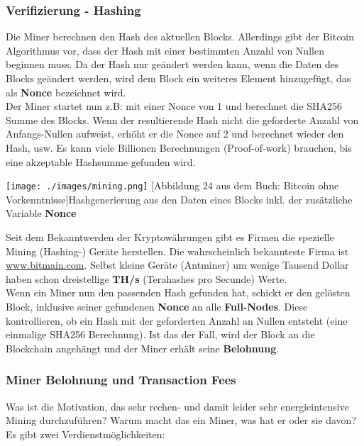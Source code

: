 \documentclass[10pt,a4paper,titlepage]{article}
\begin{document}
\subsubsection{Verifizierung - Hashing}
Die Miner berechnen den Hash des aktuellen Blocks. Allerdings gibt der Bitcoin Algorithmus vor, dass der Hash mit einer bestimmten Anzahl von Nullen beginnen muss. Da der Hash nur geändert werden kann, wenn die Daten des Blocks geändert werden, wird dem Block ein weiteres Element hinzugefügt, das als \textbf{Nonce} bezeichnet wird.\\
Der Miner startet nun z.B: mit einer Nonce von 1 und berechnet die SHA256 Summe des Blocks. Wenn der resultierende Hash nicht die geforderte Anzahl von Anfangs-Nullen aufweist, erhöht er die Nonce auf 2 und berechnet wieder den Hash, usw. Es kann viele Billionen Berechnungen (Proof-of-work) brauchen, bis eine akzeptable Hashsumme gefunden wird.
\begin{center}
\texttt{[image: ./images/mining.png]}
[Abbildung 24 aus dem Buch: Bitcoin ohne Vorkenntnisse]{Hashgenerierung aus den Daten eines Blocks inkl. der zusätzliche Variable \textbf{Nonce}}
\end{center}
Seit dem Bekanntwerden der Kryptowährungen gibt es Firmen die spezielle Mining (Hashing-) Geräte herstellen. Die wahrscheinlich bekannteste Firma ist \href{https://www.bitmain.com/}{\color{blue}www.bitmain.com}. Selbst kleine Geräte (Antminer) um wenige Tausend Dollar haben schon dreistellige \textbf{TH/s} (Terahashes pro Secunde) Werte.
\vspace{.3cm}\\
Wenn ein Miner nun den passenden Hash gefunden hat, schickt er den gelösten Block, inklusive seiner gefundenen \textbf{Nonce} an alle \textbf{Full-Nodes}. Diese kontrollieren, ob ein Hash mit der geforderten Anzahl an Nullen entsteht (eine einmalige SHA256 Berechnung). Ist das der Fall, wird der Block an die Blockchain angehängt und der Miner erhält seine \textbf{Belohnung}.
\subsubsection{Miner Belohnung und Transaction Fees}
Was ist die Motivation, das sehr rechen- und damit leider sehr energieintensive Mining durchzuführen? Warum macht das ein Miner, was hat er oder sie davon?\\
Es gibt zwei Verdienstmöglichkeiten:
\end{document}
